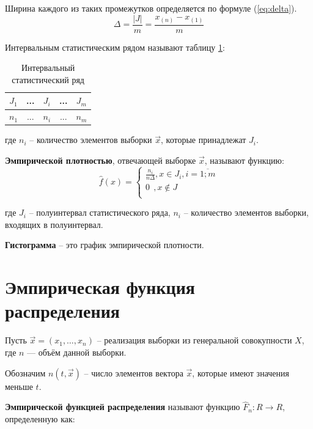 Ширина каждого из таких промежутков определяется по формуле (\ref{eq:delta}).
\begin{equation}
	\label{eq:delta}
	\Delta = \frac{|J|}{m} = \frac{x_{(n)} - x_{(1)}}{m}
\end{equation}

Интервальным статистическим рядом называют таблицу \ref{table:row1}:

\begin{table}[ht!]
	\captionsetup{singlelinecheck = false, justification=centering}
	\caption{Интервальный статистический ряд}
	\centering
	\label{table:row1}
	\begin{tabular}{|c|c|c|c|c|}
		\hline
		$J_1$ & ... & $J_i$ & ... & $J_m$ \\
		\hline
		$n_1$ & ... & $n_i$ & ... & $n_m$ \\
		\hline
	\end{tabular}
\end{table}

где $n_i$ -- количество элементов выборки $\vec x$, которые принадлежат $J_i$.

\textbf{Эмпирической плотностью}, отвечающей выборке $\vec x$, называют функцию:
\begin{equation}
	\hat f(x) =
	\begin{cases}
		\frac{n_i}{n \Delta}, x \in J_i, i = \overline{1; m} \\
		0\ \ , x \not\in J \\
	\end{cases}
\end{equation}

где $J_i$ -- полуинтервал статистического ряда, 
$n_i$ -- количество элементов выборки, входящих в полуинтервал.

\textbf{Гистограмма} -- это график эмпирической плотности. 


\section{Эмпирическая функция распределения}

Пусть $\vec{x} = (x_1, \dots, x_n)$ -- реализация выборки из генеральной совокупности $X$, где $n$ --- объём данной выборки.

Обозначим $n(t, \vec x)$ -- число элементов вектора $\vec x$, которые имеют значения меньше $t$.

\textbf{Эмпирической функцией распределения} называют функцию \newline
$\hat F_n: R \to R$, определенную как: 

